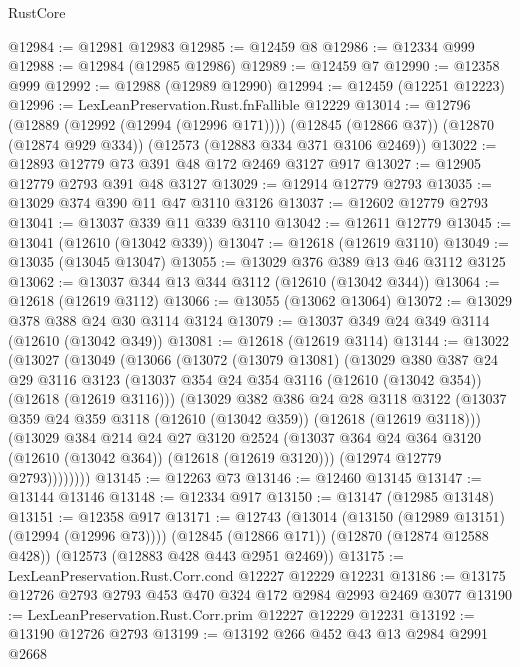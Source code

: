 \begin{lexlean}{RustCore}
\begin{coremodule}
@12984 := @12981 @12983
@12985 := @12459 @8
@12986 := @12334 @999
@12988 := @12984 (@12985 @12986)
@12989 := @12459 @7
@12990 := @12358 @999
@12992 := @12988 (@12989 @12990)
@12994 := @12459 (@12251 @12223)
@12996 := LexLeanPreservation.Rust.fnFallible @12229
@13014 := @12796
    (@12889 (@12992 (@12994 (@12996 @171))))
    (@12845 (@12866 @37))
    (@12870 (@12874 @929 @334))
    (@12573 (@12883 @334 @371 @3106 @2469))
@13022 := @12893 @12779 @73 @391 @48 @172 @2469 @3127 @917
@13027 := @12905 @12779 @2793 @391 @48 @3127
@13029 := @12914 @12779 @2793
@13035 := @13029 @374 @390 @11 @47 @3110 @3126
@13037 := @12602 @12779 @2793
@13041 := @13037 @339 @11 @339 @3110
@13042 := @12611 @12779
@13045 := @13041 (@12610 (@13042 @339))
@13047 := @12618 (@12619 @3110)
@13049 := @13035 (@13045 @13047)
@13055 := @13029 @376 @389 @13 @46 @3112 @3125
@13062 := @13037 @344 @13 @344 @3112 (@12610 (@13042 @344))
@13064 := @12618 (@12619 @3112)
@13066 := @13055 (@13062 @13064)
@13072 := @13029 @378 @388 @24 @30 @3114 @3124
@13079 := @13037 @349 @24 @349 @3114 (@12610 (@13042 @349))
@13081 := @12618 (@12619 @3114)
@13144 := @13022
    (@13027
      (@13049
        (@13066
          (@13072
            (@13079 @13081)
            (@13029
              @380
              @387
              @24
              @29
              @3116
              @3123
              (@13037 @354 @24 @354 @3116 (@12610 (@13042 @354)) (@12618 (@12619 @3116)))
              (@13029
                @382
                @386
                @24
                @28
                @3118
                @3122
                (@13037 @359 @24 @359 @3118 (@12610 (@13042 @359)) (@12618 (@12619 @3118)))
                (@13029
                  @384
                  @214
                  @24
                  @27
                  @3120
                  @2524
                  (@13037 @364 @24 @364 @3120 (@12610 (@13042 @364)) (@12618 (@12619 @3120)))
                  (@12974 @12779 @2793))))))))
@13145 := @12263 @73
@13146 := @12460 @13145
@13147 := @13144 @13146
@13148 := @12334 @917
@13150 := @13147 (@12985 @13148)
@13151 := @12358 @917
@13171 := @12743
    (@13014 (@13150 (@12989 @13151) (@12994 (@12996 @73))))
    (@12845 (@12866 @171))
    (@12870 (@12874 @12588 @428))
    (@12573 (@12883 @428 @443 @2951 @2469))
@13175 := LexLeanPreservation.Rust.Corr.cond @12227 @12229 @12231
@13186 := @13175 @12726 @2793 @2793 @453 @470 @324 @172 @2984 @2993 @2469 @3077
@13190 := LexLeanPreservation.Rust.Corr.prim @12227 @12229 @12231
@13192 := @13190 @12726 @2793
@13199 := @13192 @266 @452 @43 @13 @2984 @2991 @2668

\end{coremodule}
\end{lexlean}
